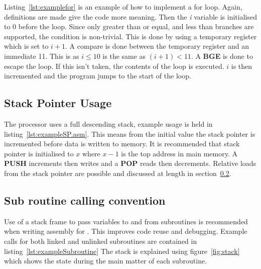 

Listing~\ref{lst:examplefor} is an example of how to implement a for loop. 
Again, definitions are made give the code more meaning. 
Then the \textit{i} variable is initialised to 0 before the loop. 
Since only greater than or equal, and less than branches are supported, the condition is non-trivial.
This is done by using a temporary register which is set to $i + 1$. 
A compare is done between the temporary register and an immediate 11.
This is as $i \leq 10$ is the same as $(i+1) < 11$. 
A \textbf{BGE} is done to escape the loop. 
If this isn't taken, the contents of the loop is executed.
$i$ is then incremented and the program jumps to the start of the loop. 







\subsection{Stack Pointer Usage}

The \samurai{} processor uses a full descending stack, example usage is held in listing~\ref{lst:exampleSP.asm}.
This means from the initial value the stack pointer is incremented before data is written to memory.
It is recommended that stack pointer is initialised to $x$ where $x-1$ is the top address in main memory. 
A \textbf{PUSH} increments then writes and a \textbf{POP} reads then decrements.
Relative loads from the stack pointer are possible and discussed at length in section~\ref{sec:subroutine_calls}.


\subsection{Sub routine calling convention}
\label{sec:subroutine_calls}

Use of a stack frame to pass variables to and from subroutines is recommended when writing assembly for \samurai{}.
This improves code reuse and debugging. 
Example calls for both linked and unlinked subroutines are contained in listing~\ref{lst:exampleSubroutine}
The stack is explained using figure~\ref{fig:stack} which shows the state during the main matter of each subroutine.

